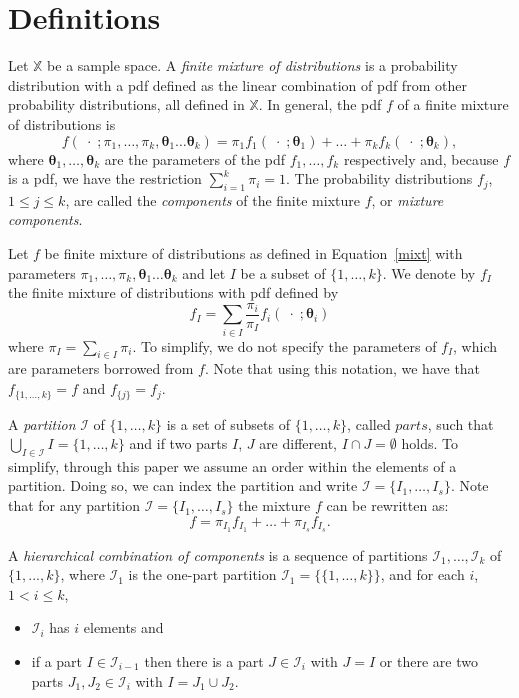 \documentclass[10pt, a4paper]{article}
\newcommand{\m}[1]{\boldsymbol{#1}}
\begin{document}
\section{Definitions}
\label{definitions}

Let $\mathbb{X}$ be a sample space. A \emph{finite mixture of distributions} is a probability distribution with a pdf defined as the linear combination of pdf from other probability distributions, all defined in $\mathbb{X}$. In general, the pdf $f$ of a finite mixture of distributions is
\begin{equation}\label{mixt}
f(\;\cdot\; ; \pi_1, \dots, \pi_k, \m\theta_1 \dots \m\theta_k) = \pi_1 f_1(\;\cdot\; ; \m\theta_1) + \dots + \pi_k f_k(\;\cdot\; ; \m\theta_k),
\end{equation}
where $\m\theta_1, \dots,  \m\theta_k$ are the parameters of the pdf $f_1, \dots, f_k$ respectively and, because $f$ is a pdf, we have the restriction $\sum_{i=1}^k \pi_i = 1$. The probability distributions $f_j$, $1 \leq j \leq k$, are called the \emph{components} of the finite mixture $f$, or \emph{mixture components}.

Let $f$ be finite mixture of distributions as defined in Equation~\ref{mixt} with  parameters  $\pi_1, \dots, \pi_k, \m\theta_1 \dots \m\theta_k$ and let $I$  be a subset of $\{1, \dots, k\}$. We denote by $f_I$ the finite mixture of distributions with pdf defined by
\[
f_I = \sum_{i \in I} \frac{\pi_i}{\pi_I} f_i(\;\cdot\; ; \m\theta_i)
\]
where $\pi_I = \sum_{i \in I} \pi_i$. To simplify, we do not specify the parameters of $f_I$, which are parameters borrowed from $f$. Note that using this notation, we have that $f_{\{1, \dots, k\}} = f$ and $f_{\{j\}} = f_j$.

A \emph{partition} $\mathcal{I}$ of $\{1, \dots, k\}$ is a set of subsets of $\{1, \dots, k\}$, called $parts$, such that $\bigcup_{I \in \mathcal{I}} I = \{1, \dots, k\}$ and  if two parts $I$, $J$ are different, $I \cap J = \emptyset$ holds. To simplify, through this paper we assume an order within the elements of a partition. Doing so, we can index the partition and write $\mathcal{I} = \{ I_1, \dots, I_s\}$. Note that for any partition $\mathcal{I} = \{ I_1, \dots, I_s\}$ the mixture $f$ can be rewritten as:
\[
f = \pi_{I_1} f_{I_1} + \dots + \pi_{I_s} f_{I_s}.
\]


A \emph{hierarchical combination of components} is a sequence of partitions $\mathcal{I}_1, \dots, \mathcal{I}_k$ of $\{1,...,k\}$, where $\mathcal{I}_1$ is the one-part partition $\mathcal{I}_1 = \{ \{1, \dots, k\} \}$, and for each $i$, $1 <  i \leq k$,
\begin{itemize}
\item $\mathcal{I}_i$ has $i$ elements  and
\item if a part $I \in \mathcal{I}_{i-1}$ then there is a part $J \in \mathcal{I}_i$ with $J = I$ or there are two parts $J_1, J_2 \in \mathcal{I}_i$ with $I = J_1 \cup J_2$.
\end{itemize}
\end{document}
